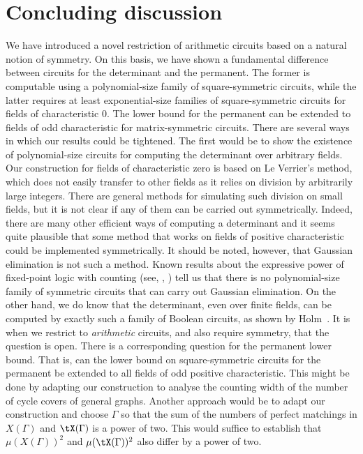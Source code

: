 \documentclass{toc}
\begin{document}
\section{Concluding discussion}
We have introduced a novel restriction of arithmetic circuits based on a natural
notion of symmetry. On this basis, we have shown a fundamental difference
between circuits for the determinant and the permanent.  The former is computable
using a polynomial-size family of
square-symmetric circuits, while the latter requires at least exponential-size
families of square-symmetric circuits for fields of characteristic $0$.  The
lower bound for the permanent can be extended to fields of odd
%
characteristic for matrix-symmetric circuits.
There are several ways in which our results could be tightened. The first would
be to show the existence of polynomial-size circuits for computing the
determinant over arbitrary fields.  Our construction for fields of characteristic
zero is based on Le Verrier's method, which does not easily transfer to other
fields as it relies on division by arbitrarily large integers.  There are general
methods for simulating such division on small fields, but it is not clear if any
of them can be carried out symmetrically.  Indeed, there are many other efficient
ways of computing a determinant and it seems quite plausible that some method that
works on fields of positive characteristic could be implemented symmetrically.
It should be noted, however, that Gaussian elimination is not such a method.
Known results about the expressive power of fixed-point logic with counting
(see, \eg, \cite{Dawar15}) tell us that there is no polynomial-size family of
symmetric circuits that can carry out Gaussian elimination.  On the other hand,
we do know that the determinant, even over finite fields, can be computed by
exactly such a family of Boolean circuits, as shown by Holm~\cite{Holm10}.  It is
when we restrict to \emph{arithmetic} circuits, and also require symmetry, that
the question is open.
There is a corresponding question for the permanent lower bound. That is, can the
lower bound on square-symmetric circuits for the permanent be extended to all
fields of odd positive characteristic. This might be done by adapting our
construction to analyse the counting width of the number of cycle covers of
general graphs. Another approach would be to adapt our construction and choose
$\Gamma$ so that the sum of the numbers of perfect matchings in $X(\Gamma)$ and $\tX(\Gamma)$
is a power of two.  This would suffice to establish that $\mu(X(\Gamma))^2$ and $\mu(\tX(\Gamma))^2$ also differ by a power of two.
\end{document}
